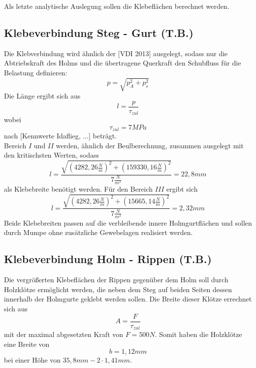 Als letzte analytische Auslegung sollen die Klebeflächen berechnet werden.
\subsection{Klebeverbindung Steg - Gurt (T.B.)}
Die Klebverbindung wird ähnlich der [VDI 2013]  ausgelegt, sodass nur die Abtriebskraft des Holms und die übertragene Querkraft den Schubfluss für die Belastung definieren:
\begin{equation}
	p=\sqrt{p_{A}^{2}+p_{s}^{2}}
\end{equation}
Die Länge ergibt sich aus 
\begin{equation}
	l=\frac{p}{\tau_{zul}}
\end{equation}
wobei 
\begin{equation}
	\tau_{zul}=7MPa
\end{equation}
nach [Kennwerte Idaflieg, ...] beträgt.\\

\noindent Bereich $I$ und $II$ werden, ähnlich der Beulberechnung, zusammen ausgelegt mit den kritischsten Werten, sodass 
\begin{equation}
	l=\frac{\sqrt{(4282,26\frac{N}{m})^{2}+(159330,16\frac{N}{m})^{2}}}{7\frac{N}{m^{2}}}=22,8mm
\end{equation}
als Klebebreite benötigt werden. Für den Bereich $III$ ergibt sich
\begin{equation}
	l=\frac{\sqrt{(4282,26\frac{N}{m})^{2}+(15665,14\frac{N}{m})^{2}}}{7\frac{N}{m^{2}}}=2,32mm
\end{equation}
Beide Klebebreiten passen auf die verbleibende innere Holmgurtflächen und sollen durch Mumpe ohne zusätzliche Gewebelagen realisiert werden.

\subsection{Klebeverbindung Holm - Rippen (T.B.)}
Die vergrößerten Klebeflächen der Rippen gegenüber dem Holm soll durch Holzklötze ermöglicht werden, die neben dem Steg auf beiden Seiten dessen innerhalb der Holmgurte geklebt werden sollen. Die Breite dieser Klötze errechnet sich aus 
\begin{equation}
	A=\frac{F}{\tau_{zul}}
\end{equation}
mit der maximal abgesetzten Kraft von $F=500N$.
Somit haben die Holzklötze eine Breite von 
\begin{equation}
	b=1,12mm
\end{equation}
bei einer Höhe von $35,8mm-2\cdot 1,41mm$.